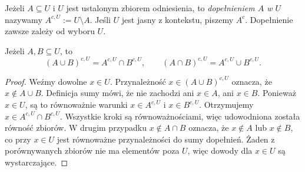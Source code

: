 \begin{definicja}
Jeżeli $A\subseteq U$ i $U$ jest ustalonym zbiorem odniesienia,
to \emph{dopełnieniem $A$ w $U$} nazywamy
$A^{c,U}:=U\setminus A$. Jeśli $U$ jest jasny z kontekstu,
piszemy $A^c$. Dopełnienie zawsze zależy od wyboru $U$.
\end{definicja}

\begin{twierdzenie}\label{thm:de-morgan-finite}
Jeżeli $A,B\subseteq U$, to
\[
(A\cup B)^{c,U}=A^{c,U}\cap B^{c,U},\qquad
(A\cap B)^{c,U}=A^{c,U}\cup B^{c,U}.
\]
\end{twierdzenie}
\begin{proof}
Weźmy dowolne $x\in U$. Przynależność
$x\in (A\cup B)^{c,U}$ oznacza, że $x\notin A\cup B$.
Definicja sumy mówi, że nie zachodzi ani $x\in A$, ani
$x\in B$. Ponieważ $x\in U$, są to równoważnie warunki
$x\in A^{c,U}$ i $x\in B^{c,U}$. Otrzymujemy
$x\in A^{c,U}\cap B^{c,U}$. Wszystkie kroki są
równoważnościami, więc udowodniona została równość zbiorów.
W drugim przypadku $x\notin A\cap B$ oznacza,
że $x\notin A$ lub $x\notin B$, co przy $x\in U$
jest równoważne przynależności do sumy dopełnień.
Żaden z porównywanych zbiorów nie ma elementów poza $U$,
więc dowody dla $x\in U$ są wystarczające.
\end{proof}

